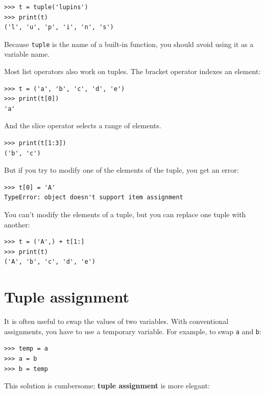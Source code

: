 \documentclass[10pt]{book}
\begin{document}
\beforeverb
\begin{verbatim}
>>> t = tuple('lupins')
>>> print(t)
('l', 'u', 'p', 'i', 'n', 's')
\end{verbatim}
\afterverb
%
Because {\tt tuple} is the name of a built-in function, you should
avoid using it as a variable name.

Most list operators also work on tuples.  The bracket operator
indexes an element:


\beforeverb
\begin{verbatim}
>>> t = ('a', 'b', 'c', 'd', 'e')
>>> print(t[0])
'a'
\end{verbatim}
\afterverb
%
And the slice operator selects a range of elements.


\beforeverb
\begin{verbatim}
>>> print(t[1:3])
('b', 'c')
\end{verbatim}
\afterverb
%
But if you try to modify one of the elements of the tuple, you get
an error:


\beforeverb
\begin{verbatim}
>>> t[0] = 'A'
TypeError: object doesn't support item assignment
\end{verbatim}
\afterverb
%
You can't modify the elements of a tuple, but you can replace
one tuple with another:

\beforeverb
\begin{verbatim}
>>> t = ('A',) + t[1:]
>>> print(t)
('A', 'b', 'c', 'd', 'e')
\end{verbatim}
\afterverb
%

\section{Tuple assignment}
\label{tuple assignment}


It is often useful to swap the values of two variables.
With conventional assignments, you have to use a temporary
variable.  For example, to swap {\tt a} and {\tt b}:

\beforeverb
\begin{verbatim}
>>> temp = a
>>> a = b
>>> b = temp
\end{verbatim}
\afterverb
%
This solution is cumbersome; {\bf tuple assignment} is more elegant:
\end{document}
